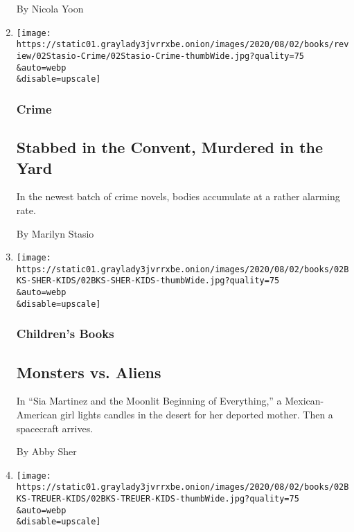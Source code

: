 \begin{enumerate}
  By Nicola Yoon
\item
  \href{/2020/07/31/books/review/crime-fiction-megan-miranda.html}{}

  \texttt{[image: https://static01.graylady3jvrrxbe.onion/images/2020/08/02/books/review/02Stasio-Crime/02Stasio-Crime-thumbWide.jpg?quality=75\\\&auto=webp\\\&disable=upscale]}

  \hypertarget{crime}{%
  \subsubsection{Crime}\label{crime}}

  \hypertarget{stabbed-in-the-convent-murdered-in-the-yard}{%
  \subsection{Stabbed in the Convent, Murdered in the
  Yard}\label{stabbed-in-the-convent-murdered-in-the-yard}}

  In the newest batch of crime novels, bodies accumulate at a rather
  alarming rate.

  By Marilyn Stasio
\item
  \href{/2020/07/31/books/review/sia-martinez-and-the-moonlit-beginning-of-everything-raquel-vasquez-gilliland.html}{}

  \texttt{[image: https://static01.graylady3jvrrxbe.onion/images/2020/08/02/books/02BKS-SHER-KIDS/02BKS-SHER-KIDS-thumbWide.jpg?quality=75\\\&auto=webp\\\&disable=upscale]}

  \hypertarget{childrens-books-2}{%
  \subsubsection{Children's Books}\label{childrens-books-2}}

  \hypertarget{monsters-vs-aliens}{%
  \subsection{Monsters vs. Aliens}\label{monsters-vs-aliens}}

  In ``Sia Martinez and the Moonlit Beginning of Everything,'' a
  Mexican-American girl lights candles in the desert for her deported
  mother. Then a spacecraft arrives.

  By Abby Sher
\item
  \href{/2020/07/31/books/review/the-brave-james-bird.html}{}

  \texttt{[image: https://static01.graylady3jvrrxbe.onion/images/2020/08/02/books/02BKS-TREUER-KIDS/02BKS-TREUER-KIDS-thumbWide.jpg?quality=75\\\&auto=webp\\\&disable=upscale]}


\end{enumerate}
